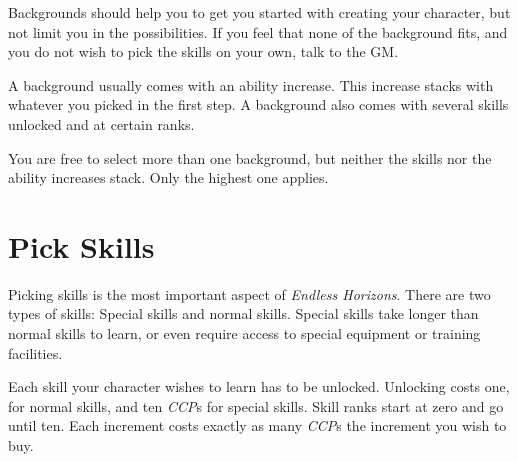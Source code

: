 Backgrounds should help you to get you started with creating your character, but
not limit you in the possibilities. If you feel that none of the background fits,
and you do not wish to pick the skills on your own, talk to the GM.

A background usually comes with an ability increase. This increase stacks with
whatever you picked in the first step. A background also comes with several
skills unlocked and at certain ranks.

You are free to select more than one background, but neither the skills nor the
ability increases stack. Only the highest one applies.

\section{Pick Skills}
\label{sec:2-Pick Skills}

Picking skills is the most important aspect of \emph{Endless Horizons}. There
are two types of skills: Special skills and normal skills. Special skills take
longer than normal skills to learn, or even require access to special equipment
or training facilities.

Each skill your character wishes to learn has to be unlocked. Unlocking costs
one, for normal skills, and ten \emph{CCP}s for special skills. Skill ranks
start at zero and go until ten. Each increment costs exactly as many
\emph{CCP}s the increment you wish to buy.
